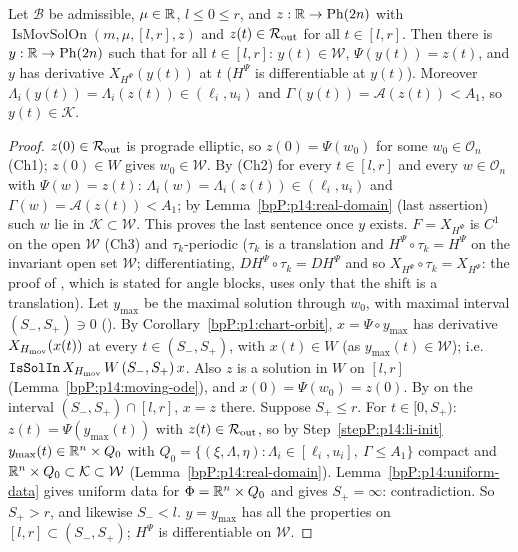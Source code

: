 \begin{proposition}\label{bpP:p14:lift}
Let $\mathcal B$ be admissible, $\mu\in\mathbb{R}$, $l\le0\le r$, and $z:\mathbb{R}\to\mathrm{Ph}(2n)$ with $\operatorname{IsMovSolOn}(m,\mu,[l,r],z)$ and $z(t)\in\mathcal R_{\rm out}$ for all $t\in[l,r]$. Then there is $y:\mathbb{R}\to\mathrm{Ph}(2n)$ such that for all $t\in[l,r]$: $y(t)\in\mathcal W$, $\Psi(y(t))=z(t)$, and $y$ has derivative $X_{H^\Psi}(y(t))$ at $t$ ($H^\Psi$ is differentiable at $y(t)$). Moreover $\Lambda_i(y(t))=\Lambda_i(z(t))\in(\ell_i,u_i)$ and $\Gamma(y(t))=\mathcal A(z(t))<A_1$, so $y(t)\in\mathcal K$.
\end{proposition}
\begin{proof}
\label{stepP:p14:li-init} $z(0)\in\mathcal R_{\rm out}$ is prograde elliptic, so $z(0)=\Psi(w_0)$ for some $w_0\in\mathcal O_n$ (Ch1); $z(0)\in W$ gives $w_0\in\mathcal W$. By (Ch2) for every $t\in[l,r]$ and every $w\in\mathcal O_n$ with $\Psi(w)=z(t)$: $\Lambda_i(w)=\Lambda_i(z(t))\in(\ell_i,u_i)$ and $\Gamma(w)=\mathcal A(z(t))<A_1$; by Lemma~\ref{bpP:p14:real-domain} (last assertion) such $w$ lie in $\mathcal K\subset\mathcal W$. This proves the last sentence once $y$ exists.
\label{stepP:p14:li-max} $F=X_{H^\Psi}$ is $C^1$ on the open $\mathcal W$ (Ch3) and $\tau_k$-periodic ($\tau_k$ is a translation and $H^\Psi\circ\tau_k=H^\Psi$ on the invariant open set $\mathcal W$; differentiating, $DH^\Psi\circ\tau_k=DH^\Psi$ and so $X_{H^\Psi}\circ\tau_k=X_{H^\Psi}$: the proof of , which is stated for angle blocks, uses only that the shift is a translation). Let $y_{\max}$ be the maximal solution through $w_0$, with maximal interval $(S_-,S_+)\ni0$ ().
\label{stepP:p14:li-proj} By Corollary~\ref{bpP:p1:chart-orbit}, $x=\Psi\circ y_{\max}$ has derivative $X_{H_{\rm mov}}(x(t))$ at every $t\in(S_-,S_+)$, with $x(t)\in W$ (as $y_{\max}(t)\in\mathcal W$); i.e.\ $\texttt{IsSolIn}\,X_{H_{\rm mov}}\,W\,(S_-,S_+)\,x$. Also $z$ is a solution in $W$ on $[l,r]$ (Lemma~\ref{bpP:p14:moving-ode}), and $x(0)=\Psi(w_0)=z(0)$. By  on the interval $(S_-,S_+)\cap[l,r]$, $x=z$ there.
\label{stepP:p14:li-cont} Suppose $S_+\le r$. For $t\in[0,S_+)$: $z(t)=\Psi(y_{\max}(t))$ with $z(t)\in\mathcal R_{\rm out}$, so by Step~\ref{stepP:p14:li-init} $y_{\max}(t)\in\mathbb{R}^n\times Q_0$ with $Q_0=\{(\xi,\Lambda,\eta):\Lambda_i\in[\ell_i,u_i],\ \Gamma\le A_1\}$ compact and $\mathbb{R}^n\times Q_0\subset\mathcal K\subset\mathcal W$ (Lemma~\ref{bpP:p14:real-domain}). Lemma~\ref{bpP:p14:uniform-data} gives uniform data for $\Phi=\mathbb{R}^n\times Q_0$ and  gives $S_+=\infty$: contradiction. So $S_+>r$, and likewise $S_-<l$.
\label{stepP:p14:li-concl} $y=y_{\max}$ has all the properties on $[l,r]\subset(S_-,S_+)$; $H^\Psi$ is differentiable on $\mathcal W$.
\end{proof}

